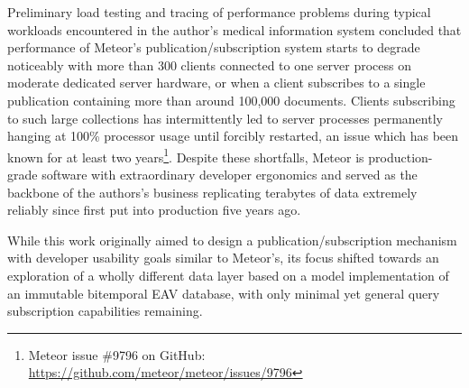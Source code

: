 Preliminary load testing and tracing of performance problems during typical workloads encountered in the author's medical information system concluded that performance of Meteor's publication/subscription system starts to degrade noticeably with more than 300 clients connected to one server process on moderate dedicated server hardware, or when a client subscribes to a single publication containing more than around 100,000 documents. Clients subscribing to such large collections has intermittently led to server processes permanently hanging at 100\% processor usage until forcibly restarted, an issue which has been known for at least two years\footnote{Meteor issue \#9796 on GitHub: \url{https://github.com/meteor/meteor/issues/9796}}. Despite these shortfalls, Meteor is production-grade software with extraordinary developer ergonomics and served as the backbone of the authors's business replicating terabytes of data extremely reliably since first put into production five years ago.

While this work originally aimed to design a publication/subscription mechanism with developer usability goals similar to Meteor's, its focus shifted towards an exploration of a wholly different data layer based on a model implementation of an immutable bitemporal EAV database, with only minimal yet general query subscription capabilities remaining.


